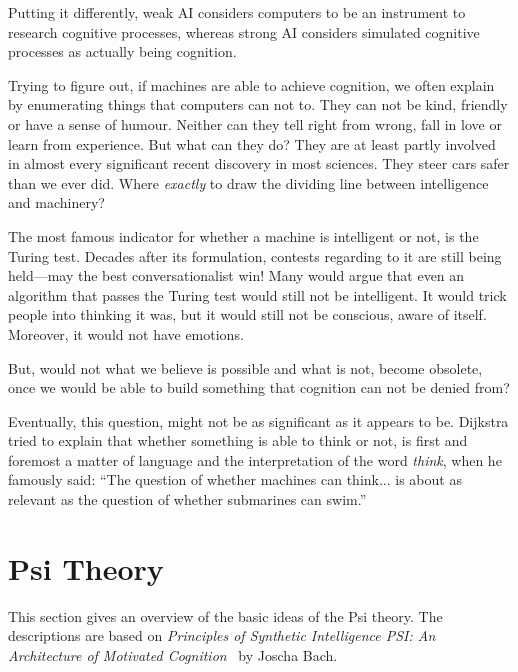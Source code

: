 Putting it differently, weak AI considers computers to be an instrument to research cognitive processes, whereas strong AI considers simulated cognitive processes as actually being cognition.


Trying to figure out, if machines are able to achieve cognition, we often explain by enumerating things that computers can not to. They can not be kind, friendly or have a sense of humour. Neither can they tell right from wrong, fall in love or learn from experience. But what can they do? They are at least partly involved in almost every significant recent discovery in most sciences. They steer cars safer than we ever did. Where \emph{exactly} to draw the dividing line between intelligence and machinery?~\cite{russell2009artificial}

The most famous indicator for whether a machine is intelligent or not, is the Turing test. Decades after its formulation, contests regarding to it are still being held---may the best conversationalist win! Many would argue that even an algorithm that passes the Turing test would still not be intelligent. It would trick people into thinking it was, but it would still not be conscious, aware of itself. Moreover, it would not have emotions.~\cite{russell2009artificial}

But, would not what we believe is possible and what is not, become obsolete, once we would be able to build something that cognition can not be denied from? 

Eventually, this question, might not be as significant as it appears to be. Dijkstra tried to explain that whether something is able to think or not, is first and foremost a matter of language and the interpretation of the word \emph{think}, when he famously said: ``The question of whether machines can think... is about as relevant as the question of whether submarines can swim.''

    \section{Psi Theory}
    

This section gives an overview of the basic ideas of the Psi theory. The descriptions are based on \emph{Principles of Synthetic Intelligence PSI: An Architecture of Motivated Cognition}~\cite{Bach:2009:PSI:1611304} by Joscha Bach.

